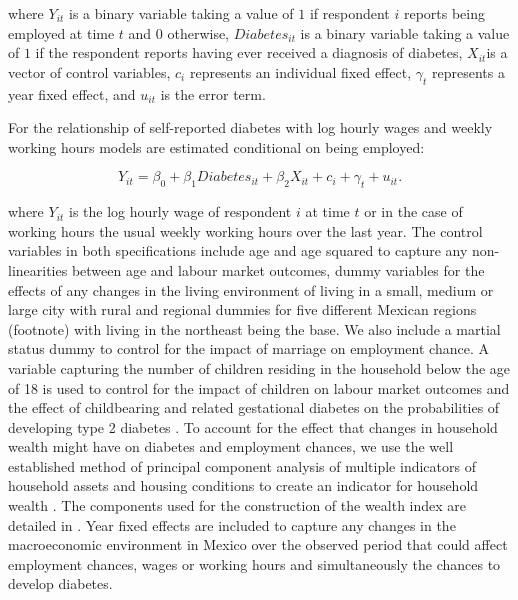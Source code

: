 where $Y_{it}$ is a binary variable taking a value of $1$ if respondent
$i$ reports being employed at time $t$ and $0$ otherwise, $Diabetes_{it}$
is a binary variable taking a value of $1$ if the respondent reports
having ever received a diagnosis of diabetes, $X_{it}$is a vector
of control variables, $c_{i}$ represents an individual fixed effect,
$\gamma_{t}$ represents a year fixed effect, and $u_{it}$ is the
error term.

For the relationship of self-reported diabetes with log hourly wages
 and weekly working hours models are estimated conditional on being
employed:

\noindent 
\begin{equation}
Y_{it}=\beta_{0}+\beta_{1}Diabetes_{it}+\beta_{2}X_{it}+c_{i}+\gamma_{t}+u_{it}.\label{eq:income_working-hours}
\end{equation}


where $Y_{it}$ is the log hourly wage of respondent $i$ at time
$t$ or in the case of working hours the usual weekly working hours
over the last year. The control variables in both specifications include
age and age squared to capture any non-linearities between age and
labour market outcomes, dummy variables for the effects of any changes
in the living environment of living in a small, medium or large city
with rural and regional dummies for five different Mexican regions (footnote) with living in the northeast being the base. We also include a martial
status dummy to control for the impact of marriage on employment chance.
A variable capturing the number of children residing in the household
below the age of 18 is used to control for the impact of children
on labour market outcomes and the effect of childbearing and related
gestational diabetes on the probabilities of developing type 2 diabetes
\citep{Bellamy2009}. To account for the effect that changes in household
wealth might have on diabetes and employment chances, we use the well
established method of principal component analysis of multiple indicators
of household assets and housing conditions to create an indicator
for household wealth \citep{Filmer2001}. The components used for
the construction of the wealth index are detailed in \citet{Seuring2015}.
Year fixed effects are included to capture any changes in the macroeconomic
environment in Mexico over the observed period that could affect employment
chances, wages or working hours and simultaneously the chances to
develop diabetes.


